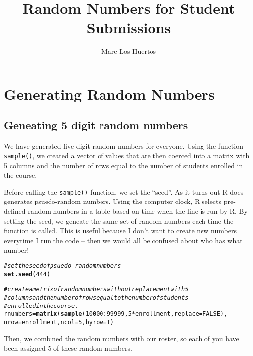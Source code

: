 \documentclass{article}\usepackage[]{graphicx}\usepackage[]{xcolor}
\title{Random Numbers for Student Submissions}
\author{Marc Los Huertos}
\makeatletter
\newcommand{\hlnum}[1]{\textcolor[rgb]{0.686,0.059,0.569}{#1}}%
\newcommand{\hlcom}[1]{\textcolor[rgb]{0.678,0.584,0.686}{\textit{#1}}}%
\newcommand{\hlopt}[1]{\textcolor[rgb]{0,0,0}{#1}}%
\newcommand{\hlstd}[1]{\textcolor[rgb]{0.345,0.345,0.345}{#1}}%
\newcommand{\hlkwb}[1]{\textcolor[rgb]{0.69,0.353,0.396}{#1}}%
\newcommand{\hlkwc}[1]{\textcolor[rgb]{0.333,0.667,0.333}{#1}}%
\newcommand{\hlkwd}[1]{\textcolor[rgb]{0.737,0.353,0.396}{\textbf{#1}}}%
\newenvironment{kframe}{%
 \def\at@end@of@kframe{}%
 \ifinner\ifhmode%
  \def\at@end@of@kframe{\end{minipage}}%
  \begin{minipage}{\columnwidth}%
 \fi\fi%
 \def\FrameCommand##1{\hskip\@totalleftmargin \hskip-\fboxsep
 \colorbox{shadecolor}{##1}\hskip-\fboxsep
     \hskip-\linewidth \hskip-\@totalleftmargin \hskip\columnwidth}%
 \MakeFramed {\advance\hsize-\width
   \@totalleftmargin\z@ \linewidth\hsize
   \@setminipage}}%
 {\par\unskip\endMakeFramed%
 \at@end@of@kframe}
\newenvironment{knitrout}{}{} %
\makeatother
\begin{document}
\maketitle


\section*{Generating Random Numbers}

\subsection*{Geneating 5 digit random numbers}

We have generated five digit random numbers for everyone. Using the function \texttt{sample()}, we created a vector of values that are then coerced into a matrix with 5 columns and the number of rows equal to the number of students enrolled in the course. 

Before calling the \texttt{sample()} function, we set the ``seed''. As it turns out R does generates psuedo-random numbers. Using the computer clock, R selects pre-defined random numbers in a table based on time when the line is run by R. By setting the seed, we geneate the same set of random numbers each time the function is called. This is useful because I don't want to create new numbers everytime I run the code -- then we would all be confused about who has what number!

\begin{knitrout}
\color{fgcolor}\begin{kframe}
\begin{alltt}
\hlcom{# set the seed of psuedo-random numbers}
\hlkwd{set.seed}\hlstd{(}\hlnum{444}\hlstd{)}

\hlcom{# create a metrix of random numbers without replacement with 5 }
\hlcom{# columns and the number of rows equal to the number of students }
\hlcom{# enrolled in the course.}
\hlstd{rnumbers} \hlkwb{=} \hlkwd{matrix}\hlstd{(}\hlkwd{sample}\hlstd{(}\hlnum{10000}\hlopt{:}\hlnum{99999}\hlstd{,} \hlnum{5}\hlopt{*} \hlstd{enrollment,} \hlkwc{replace}\hlstd{=} \hlnum{FALSE}\hlstd{),}
          \hlkwc{nrow}\hlstd{=enrollment,} \hlkwc{ncol}\hlstd{=}\hlnum{5}\hlstd{,} \hlkwc{byrow}\hlstd{=T)}
\end{alltt}
\end{kframe}
\end{knitrout}

Then, we combined the random numbers with our roster, so each of you have been assigned 5 of these random numbers. 
\end{document}
